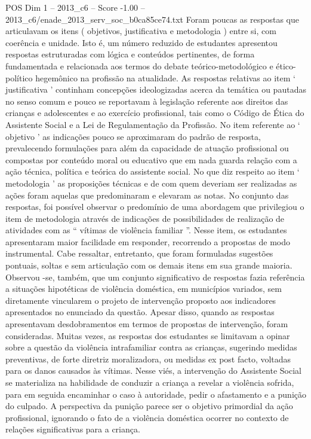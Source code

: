 \begin{textsample}{POS Dim 1 – 2013\_c6 – Score -1.00 – 2013\_c6/enade\_2013\_serv\_soc\_b0ca85ce74.txt}
Foram poucas as respostas que articulavam os itens ( objetivos, justificativa e metodologia ) entre si, com coerência e unidade.
Isto é, um número reduzido de estudantes apresentou respostas estruturadas com lógica e conteúdos pertinentes, de forma fundamentada e relacionada aos termos do debate teórico-metodológico e ético-político hegemônico na profissão na atualidade.
As respostas relativas ao item ‘ justificativa ’ continham concepções ideologizadas acerca da temática ou pautadas no senso comum e pouco se reportavam à legislação referente aos direitos das crianças e adolescentes e ao exercício profissional, tais como o Código de Ética do Assistente Social e a Lei de Regulamentação da Profissão.
No item referente ao ‘ objetivo ’ as indicações pouco se aproximaram do padrão de resposta, prevalecendo formulações para além da capacidade de atuação profissional ou compostas por conteúdo moral ou educativo que em nada guarda relação com a ação técnica, política e teórica do assistente social.
No que diz respeito ao item ‘ metodologia ’ as proposições técnicas e de com quem deveriam ser realizadas as ações foram aquelas que predominaram e elevaram as notas.
No conjunto das respostas, foi possível observar o predomínio de uma abordagem que privilegiou o item de metodologia através de indicações de possibilidades de realização de atividades com as “ vítimas de violência familiar ”.
Nesse item, os estudantes apresentaram maior facilidade em responder, recorrendo a propostas de modo instrumental.
Cabe ressaltar, entretanto, que foram formuladas sugestões pontuais, soltas e sem articulação com os demais itens em sua grande maioria.
Observou -se, também, que um conjunto significativo de respostas fazia referência a situações hipotéticas de violência doméstica, em municípios variados, sem diretamente vincularem o projeto de intervenção proposto aos indicadores apresentados no enunciado da questão.
Apesar disso, quando as respostas apresentavam desdobramentos em termos de propostas de intervenção, foram consideradas.
Muitas vezes, as respostas dos estudantes se limitavam a opinar sobre a questão da violência intrafamiliar contra as crianças, sugerindo medidas preventivas, de forte diretriz moralizadora, ou medidas ex post facto, voltadas para os danos causados às vítimas.
Nesse viés, a intervenção do Assistente Social se materializa na habilidade de conduzir a criança a revelar a violência sofrida, para em seguida encaminhar o caso à autoridade, pedir o afastamento e a punição do culpado.
A perspectiva da punição parece ser o objetivo primordial da ação profissional, ignorando o fato de a violência doméstica ocorrer no contexto de relações significativas para a criança.

\end{textsample}
